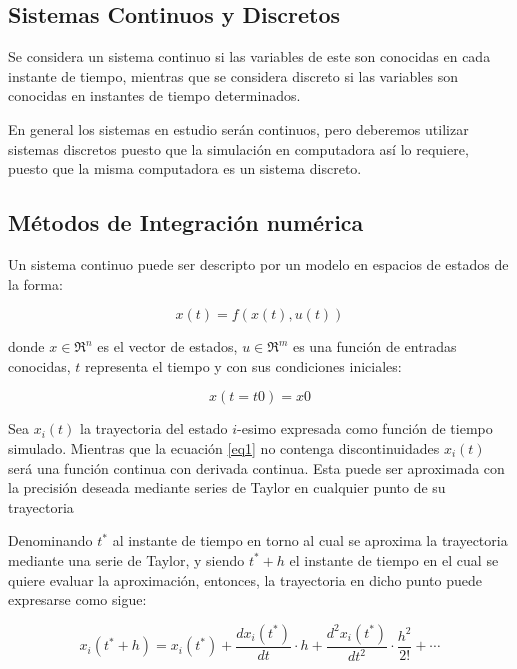 \documentclass[a4paper,	11pt]{report}
\begin{document}
\subsection{Sistemas Continuos y Discretos}
Se considera un sistema continuo si las variables de este son conocidas en cada instante de tiempo, mientras que se considera discreto si las variables son conocidas en instantes de tiempo determinados.

En general los sistemas en estudio serán continuos, pero deberemos utilizar sistemas discretos puesto que la simulación en computadora así lo requiere, puesto que la misma computadora es un sistema discreto.

\subsection{Métodos de Integración numérica}

Un sistema continuo puede ser descripto por un modelo en espacios de estados de la forma:

\begin{equation} \label{eq1}
x(t) = f (x(t), u(t))
\end{equation}

donde $x \in \Re^n$  es el vector de estados, $u \in \Re^m$ es una función de entradas conocidas,
$t$ representa el tiempo y con sus condiciones iniciales:

\begin{equation} \label{eq2}
x(t = t 0 ) = x 0
\end{equation}

Sea $x_i (t)$ la trayectoria del estado $i$-esimo expresada como función de tiempo simulado. 
Mientras que la ecuación \eqref{eq1} no contenga discontinuidades $x_i (t)$ será una función continua con derivada continua. Esta puede ser aproximada con la precisión deseada mediante series de Taylor en cualquier punto de su trayectoria

Denominando $t^{\ast}$ al instante de tiempo en torno al cual se aproxima la trayectoria mediante una serie de Taylor, y siendo $t^{\ast} + h$ el instante de tiempo en el cual se quiere evaluar la aproximación, entonces, la trayectoria en dicho punto puede expresarse como sigue:

\begin{equation} \label{eq3}
x_i(t^* + h) = x_i(t^*) + \frac{dx_i (t^*)}{dt} \cdot h + \frac{d^{2}x_i (t^*)}{dt^2} \cdot \frac{h^2}{2!} + \cdots
\end{equation}
\end{document}
